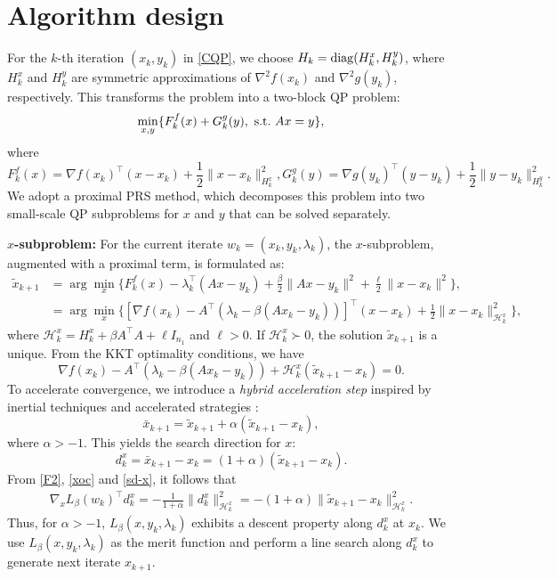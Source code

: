 \documentclass[pdflatex,sn-mathphys-num]{sn-jnl}%
\theoremstyle{thmstyleone}%
\theoremstyle{thmstyletwo}%
\theoremstyle{thmstylethree}%
\begin{document}
\section{Algorithm design}\label{sec3}
For the $k$-th iteration $(x_k,y_k)$ in \eqref{CQP}, we choose $H_k={\rm diag}(H_k^x,H_k^y)$, where $H_k^x$ and $H_k^y$ are symmetric approximations of $\nabla^2 f(x_k)$ and $\nabla^2 g(y_k)$, respectively. This transforms the problem into a two-block QP problem:
\[\min_{x, y}\{F_k^f(x)+G_k^g(y),\ {\rm s.t.}  \ A x=y\} ,\]
where
\[
F_k^f(x)=\nabla f(x_k)^{\top}(x-x_k)+\frac{1}{2}\|x-x_k\|_{H_k^x}^2,
G_k^g(y)=\nabla g(y_k)^{\top}(y-y_k)+\frac{1}{2}\|y-y_k\|_{H_k^y}^2.
\]
We adopt a proximal PRS method, which decomposes this problem into two small-scale QP subproblems for $x$ and $y$ that can be solved separately.

\textbf{$x$-subproblem:} For the current iterate $w_k=(x_k,y_k,\lambda_k)$, the $x$-subproblem, augmented with a proximal term, is formulated as:
\begin{align}
	\tilde{x}_{k+1}&=\arg\min_x\{F_k^f(x)-\lambda_{k}^{\top}(A x-y_{k})+\frac{\beta}{2}\|A x-y_{k}\|^2+ \frac{\ell}{2}\|x-x_k\|^2\},\nonumber\\
	&=\arg\min_x\{[\nabla f(x_{k})-A^{\top}(\lambda_{k}-\beta(A x_{k}-y_{k}))]^{\top}(x-x_{k})+\frac{1}{2}\|x-x_{k}\|_{\mathcal{H}_k^x}^{2}\},\label{xQP}
\end{align}
where $\mathcal{H}_k^x=H_k^x+\beta A^{\top}A+\ell I_{n_1}$ and $\ell>0$. If $\mathcal{H}_k^x\succ0$, the solution $\tilde{x}_{k+1}$ is a unique. From the KKT optimality conditions, we have
\begin{equation}\label{xoc}
\nabla f(x_{k})-A^{\top}(\lambda_{k}-\beta(A x_{k}-y_{k}))+\mathcal{H}_k^x(\tilde{x}_{k+1}-x_{k})=0.
\end{equation}
To accelerate convergence, we introduce a {\it hybrid acceleration step} inspired by inertial techniques \cite{AA01} and accelerated strategies \cite{GCH20}:
\begin{equation}\label{xines}
\bar{x}_{k+1}=\tilde{x}_{k+1}+\alpha(\tilde{x}_{k+1}-x_{k}),
\end{equation}
where $\alpha>-1$. This yields the search direction for $x$:
\begin{equation}\label{sd-x}
d_{k}^{x} = \bar{x}_{k+1}-x_{k}=(1+\alpha)(\tilde{x}_{k+1}-x_{k}).
\end{equation}
From \eqref{F2}, \eqref{xoc} and \eqref{sd-x}, it follows that
\begin{align}
\nabla_x L_{\beta}(w_k)^{\top}d_k^x=- \frac{1}{1+\alpha}\|d_k^x\|_{\mathcal{H}_k^x}^2
=-(1+\alpha)\|\tilde{x}_{k+1}-x_{k}\|_{\mathcal{H}_k^x}^2.
\label{xd}
\end{align}
Thus, for $\alpha>-1$, $L_{\beta}(x,y_k,\lambda_k)$ exhibits a descent property along $d_{k}^{x}$ at $x_k$. We use $L_{\beta}(x,y_k,\lambda_k)$ as the merit function and perform a line search along $d_{k}^{x}$ to generate next iterate $x_{k+1}$.
\end{document}
